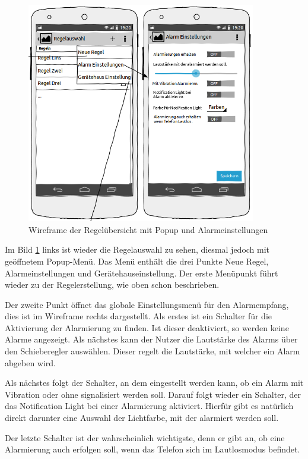 \begin{figure}
\vspace{-13pt}
\includegraphics[width=10cm]{Bilder/WireframeRegeluebersicht_popup.png}
\caption{Wireframe der Regel\"ubersicht mit Popup und Alarmeinstellungen}
\label{Wireframe Regeluebersicht Popup}
\vspace{-20pt}
\end{figure}
Im Bild \ref{Wireframe Regeluebersicht Popup} links ist wieder die Regelauswahl zu sehen, diesmal jedoch mit ge\"offnetem Popup-Men\"u. Das Men\"u enth\"alt die drei Punkte Neue Regel, Alarmeinstellungen und Ger\"atehauseinstellung. Der erste Men\"upunkt f\"uhrt wieder zu der Regelerstellung, wie oben schon beschrieben. 

Der zweite Punkt \"offnet das globale Einstellungsmen\"u f\"ur den Alarmempfang, dies ist im Wireframe rechts dargestellt. Als erstes ist ein Schalter f\"ur die Aktivierung der Alarmierung zu finden. Ist dieser deaktiviert, so werden keine Alarme angezeigt. Als n\"achstes kann der Nutzer die Lautst\"arke des Alarms \"uber den Schieberegler ausw\"ahlen. Dieser regelt die Lautst\"arke, mit welcher ein Alarm abgeben wird.

Als n\"achstes folgt der Schalter, an dem eingestellt werden kann, ob ein Alarm mit Vibration oder ohne signalisiert werden soll. Darauf folgt wieder ein Schalter, der das Notification Light bei einer Alarmierung aktiviert. Hierf\"ur gibt es nat\"urlich direkt darunter eine Auswahl der Lichtfarbe, mit der alarmiert werden soll.

Der letzte Schalter ist der wahrscheinlich wichtigste, denn er gibt an, ob eine Alarmierung auch erfolgen soll, wenn das Telefon sich im Lautlosmodus befindet.

